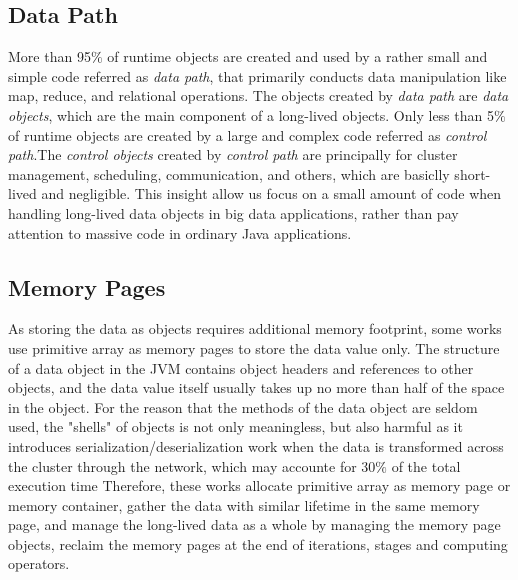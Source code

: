 \documentclass[sigplan, screen]{acmart}
\begin{document}
\subsection{Data Path}

More than 95$\%$ of runtime objects are created and used by a rather small and simple code referred as \emph{data path}, that primarily conducts data manipulation like map, 
reduce, and relational operations. The objects created by \emph{data path} are \emph{data objects}, which are the main component of a long-lived objects. Only less than 5$\%$
 of runtime objects are created by a large and complex code referred as \emph{control path}.The \emph{control objects} created by \emph{control path} are principally 
 for cluster management, scheduling, communication, and others, which are basiclly short-lived and negligible\cite{nguyen2015facade,navasca2019gerenuk,bu2013bloat,nguyen2016yak}. This insight
 allow us focus on a small amount of code when handling long-lived data objects in big data applications, rather than pay attention to massive code in ordinary Java applications.

\subsection{Memory Pages}

As storing the data as objects requires additional memory footprint, some works use primitive array as memory pages to store the data value only. 
The structure of a data object in the JVM contains object headers and references to other objects, and the data value itself usually takes up no more than half of the space 
in the object\cite{navasca2019gerenuk,bu2013bloat}. For the reason that the methods of the data object are seldom used, the "shells" of objects is not only meaningless, but also harmful as it 
introduces serialization/deserialization work when the data is transformed across the cluster through the network, which may accounte for 30$\%$ of the total execution time\cite{navasca2019gerenuk,nguyen2018skyway}   
Therefore, these works allocate primitive array as memory page or memory container, gather the data with similar lifetime in the same memory page, and manage the long-lived data 
as a whole by managing the memory page objects\cite{navasca2019gerenuk,bu2013bloat,nguyen2015facade,lu2016lifetime}, reclaim the memory pages at the end of iterations, stages and
computing operators.
\end{document}
